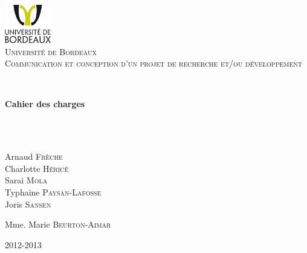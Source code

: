 \begin{titlepage}

\begin{center}

\includegraphics[width=0.15\textwidth]{logounibdx.png}\\[1cm]

\textsc{\LARGE Université de Bordeaux}\\[1.5cm]
\vspace*{2cm}
\textsc{\Large Communication et conception d'un projet de recherche et/ou développement}\\[0.5cm]

\vspace*{2cm}

\HRule \\[0.3cm]
{ \begin{Huge}
\bfseries Cahier des charges \end{Huge}}\\[0.3cm]

\HRule \\[1.3cm]
\begin{minipage}{0.4\textwidth}
\begin{center} \large
Arnaud \textsc{Frèche}\\
Charlotte \textsc{Héricé}\\
Sarai \textsc{Mola}\\
Typhaine \textsc{Paysan-Lafosse}\\
Joris \textsc{Sansen}\\
\end{center}
\end{minipage}
\begin{minipage}{0.4\textwidth}
\begin{flushright} \large
Mme. Marie \textsc{Beurton-Aimar}
\end{flushright}
\end{minipage}

\vfill

\begin{center}
2012-2013
\end{center}

\end{center}

\end{titlepage}
%